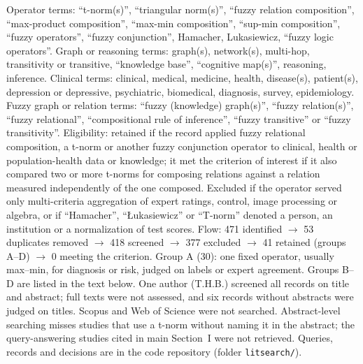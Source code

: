 \documentclass[journal]{IEEEtran}
\begin{document}
\begin{table}[!t]
\smallskip
\parbox{\columnwidth}{\scriptsize Operator terms: ``t-norm(s)'', ``triangular norm(s)'', ``fuzzy relation composition'', ``max-product composition'', ``max-min composition'', ``sup-min composition'', ``fuzzy operators'', ``fuzzy conjunction'', Hamacher, Lukasiewicz, ``fuzzy logic operators''. Graph or reasoning terms: graph(s), network(s), multi-hop, transitivity or transitive, ``knowledge base'', ``cognitive map(s)'', reasoning, inference. Clinical terms: clinical, medical, medicine, health, disease(s), patient(s), depression or depressive, psychiatric, biomedical, diagnosis, survey, epidemiology. Fuzzy graph or relation terms: ``fuzzy (knowledge) graph(s)'', ``fuzzy relation(s)'', ``fuzzy relational'', ``compositional rule of inference'', ``fuzzy transitive'' or ``fuzzy transitivity''. Eligibility: retained if the record applied fuzzy relational composition, a t-norm or another fuzzy conjunction operator to clinical, health or population-health data or knowledge; it met the criterion of interest if it also compared two or more t-norms for composing relations against a relation measured independently of the one composed. Excluded if the operator served only multi-criteria aggregation of expert ratings, control, image processing or algebra, or if ``Hamacher'', ``{\L}ukasiewicz'' or ``T-norm'' denoted a person, an institution or a normalization of test scores. Flow: 471 identified $\to$ 53 duplicates removed $\to$ 418 screened $\to$ 377 excluded $\to$ 41 retained (groups A--D) $\to$ 0 meeting the criterion. Group A (30): one fixed operator, usually max--min, for diagnosis or risk, judged on labels or expert agreement. Groups B--D are listed in the text below. One author (T.H.B.) screened all records on title and abstract; full texts were not assessed, and six records without abstracts were judged on titles. Scopus and Web of Science were not searched. Abstract-level searching misses studies that use a t-norm without naming it in the abstract; the query-answering studies cited in main Section~I were not retrieved. Queries, records and decisions are in the code repository (folder \texttt{litsearch/}).}
\end{table}
\end{document}
